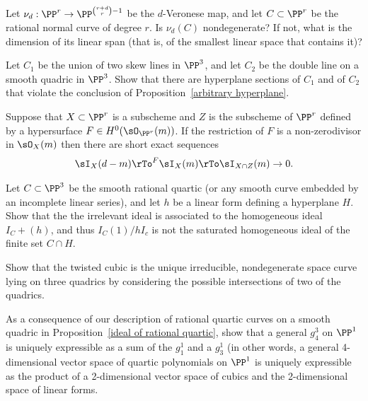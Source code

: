 \begin{exercise}
 Let $\nu_d: \PP^r \to \PP^{\binom{r+d}{r}-1}$ be the $d$-Veronese map, and let $C\subset \PP^r$ be the rational normal curve of degree $r$. Is $\nu_d(C)$ nondegenerate? If not, what is the dimension of its linear span (that is, of the smallest linear
 space that contains it)?
\end{exercise}

\begin{exercise}\label{arbitrary hyperplane examples}
Let $C_1$ be the union of two skew lines in $\PP^3$, and let $C_2$ be the double line on a smooth quadric in $\PP^3$.
Show that there are hyperplane sections of $C_1$ and of $C_2$ that violate the conclusion of Proposition~\ref{arbitrary hyperplane}.
\end{exercise}

\begin{exercise}\label{restriction of ideals}
Suppose that $X\subset \PP^r$ is a subscheme and  $Z$ is the subscheme of $\PP^r$ defined by a hypersurface $F\in H^0(\sO_{\PP^r}(m))$. If the restriction of $F$ is a non-zerodivisor in 
$\sO_X(m)$  then there are short exact sequences
$$
\sI_X(d-m) \rTo^F \sI_X(m) \rTo \sI_{X\cap Z}(m) \to 0.
$$
\end{exercise}

\begin{exercise}\label{bad restriction}
Let $C\subset \PP^3$ be the smooth rational quartic (or any smooth curve embedded by an incomplete linear series), and let $h$ be a linear form defining a hyperplane $H$.
Show that
the the irrelevant ideal is associated to the 
homogeneous ideal $I_C+(h)$, and thus $I_C(1)/hI_c$ is not the saturated homogeneous ideal of the finite
set $C\cap H$. 
\end{exercise}

\begin{exercise}
Show that the twisted cubic is the unique irreducible, nondegenerate space curve lying on three quadrics by considering the possible
intersections of two of the quadrics.
\end{exercise}

\begin{exercise}\label{decomposition of a $g^3_4$}
As a consequence of our description of rational quartic curves on a smooth quadric in Proposition~\ref{ideal of rational quartic},
show that a general $g^3_4$ on $\PP^1$ is uniquely expressible as a sum of the $g_1^1$ and a $g^1_3$
(in other words, a general 4-dimensional vector space of quartic polynomials on $\PP^1$ is uniquely expressible as the product of a 2-dimensional vector space of cubics and the 2-dimensional space of linear forms.
\end{exercise}

